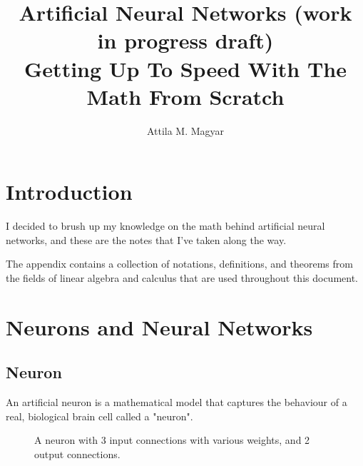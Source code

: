 \documentclass{article}
\title{%
  Artificial Neural Networks (work in progress draft) \\
  \large Getting Up To Speed With The Math From Scratch
}
\author{Attila M. Magyar}
\begin{document}
  \maketitle

  \newpage

  \tableofcontents

  \newpage

  \section{Introduction}

    I decided to brush up my knowledge on the math behind artificial neural
    networks, and these are the notes that I've taken along the way.

    The appendix contains a collection of notations, definitions, and theorems
    from the fields of linear algebra and calculus that are used throughout
    this document.

  \newpage

  \section{Neurons and Neural Networks}

    \subsection{Neuron}

      An artificial neuron is a mathematical model that captures the behaviour
      of a real, biological brain cell called a "neuron".

      \begin{figure}[!htb]
        \centering
        \caption{
          A neuron with 3 input connections with various weights,
          and 2 output connections.
        }
      \end{figure}
\end{document}
